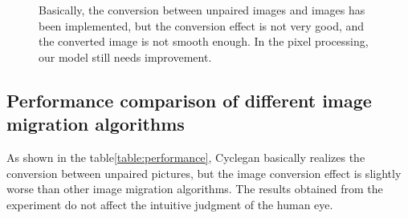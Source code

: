 \documentclass[10pt,twocolumn,letterpaper]{article}
\begin{document}
\begin{figure}
  \centering
      \space \space \space \space \space \space \space
  \caption{Basically, the conversion between unpaired images and images has been implemented, but the conversion effect is not very good, and the converted image is not smooth enough. In the pixel processing, our model still needs improvement.
  }
  
  \label{fig:change}
  
  \end{figure}

\subsection{Performance comparison of different image migration algorithms}
As shown in the table\ref{table:performance}, 
Cyclegan basically realizes the conversion 
between unpaired pictures, 
but the image conversion effect is slightly 
worse than other image migration algorithms. 
The results obtained from the experiment do 
not affect the intuitive judgment of the human eye.
\end{document}
